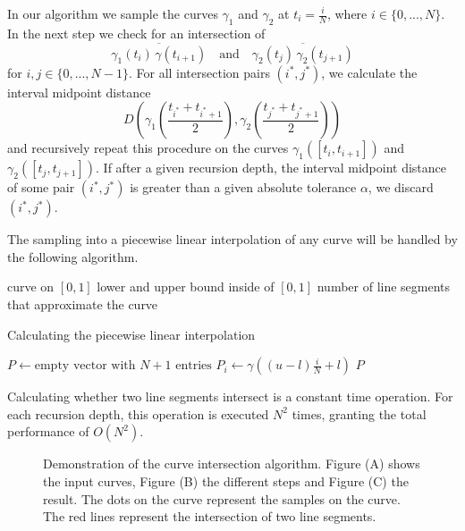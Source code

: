 \documentclass[a4paper, 11pt]{report}
\theoremstyle{definition}
\newcommand{\Desc}[2]{\State \makebox[12em][l]{#1}#2}
\begin{document}
	In our algorithm we sample the curves $\gamma_1$ and $\gamma_2$ at $t_i = \frac{i}{N}$, where $i \in \{0,...,N\}$. In the next step we check for an intersection of 
		$$\overline{\gamma_1(t_i) \, \gamma(t_{i+1})} \quad\text{and}\quad \overline{\gamma_2(t_j) \, \gamma_2(t_{j+1})}$$
	for $i,j \in \{0,...,N-1\}$. For all intersection pairs $(i^*, j^*)$, we calculate the interval midpoint distance
		$$D \left( \gamma_1 \left( \frac{t_{i^*} + t_{i^*+1}}{2} \right), \gamma_2 \left( \frac{t_{j^*} + t_{j^*+1}}{2} \right) \right)$$
	and recursively repeat this procedure on the curves $\gamma_1([t_i, t_{i+1}])$ and $\gamma_2([t_j, t_{j+1}])$. If after a given recursion depth, the interval midpoint distance of some pair $(i^*, j^*)$ is greater than a given absolute tolerance $\alpha$, we discard $(i^*, j^*)$.
	
	The sampling into a piecewise linear interpolation of any curve will be handled by the following algorithm.
	\begin{algorithm}[H]
		\begin{algorithmic}[1]
			\Input
				\Desc{$\gamma$}{curve on $[0,1]$}
				\Desc{$l,u$}{lower and upper bound inside of $[0,1]$}
				\Desc{$N$}{number of line segments that approximate the curve}
			\EndInput

			\caption{Calculating the piecewise linear interpolation}\label{alg:samplecurve}
				\State $P \gets \text{empty vector with } N+1 \text{ entries}$
					\State $P_i \gets \gamma \left( (u-l) \frac{i}{N} + l \right)$
				\EndFor
				\State \Return $P$
			\EndProcedure
		\end{algorithmic}
	\end{algorithm}
	
	Calculating whether two line segments intersect is a constant time operation. For each recursion depth, this operation is executed $N^2$ times, granting the total performance of $O(N^2)$.

	\begin{figure}[H]
		\centering
		
		\caption{Demonstration of the curve intersection algorithm. Figure (A) shows the input curves, Figure (B) the different steps and Figure (C) the result. The dots on the curve represent the samples on the curve. The red lines represent the intersection of two line segments.}
		\label{fig:piecewiselinearintersection}
	\end{figure}
	
\end{document}
